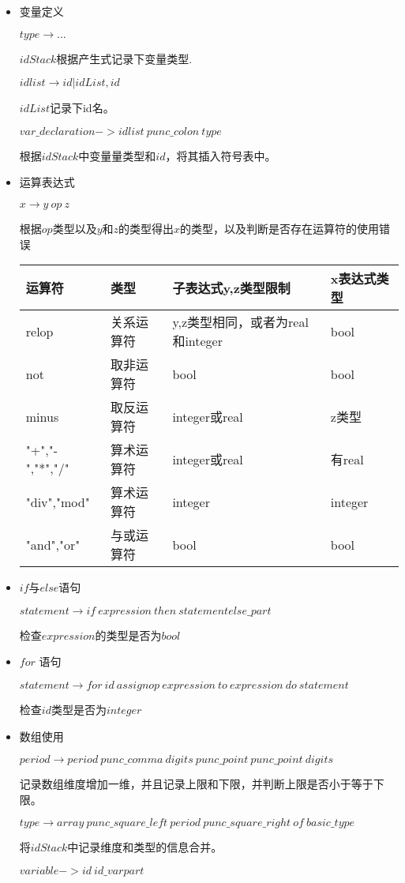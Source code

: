 \documentclass[]{ctexart}
\begin{document}
\begin{itemize}
\item
  变量定义

  \(type \to ...\)

  \(idStack\)根据产生式记录下变量类型.

  \(idlist \to id | idList,id\)

  \(idList\)记录下id名。

  \(var\_declaration->idlist\ punc\_colon\ type\)

  根据\(idStack\)中变量量类型和\(id\)，将其插入符号表中。
\item
  运算表达式

  \(x \to y\ op \ z\)

  根据\(op\)类型以及\(y\)和\(z\)的类型得出\(x\)的类型，以及判断是否存在运算符的使用错误

  \begin{longtable}[]{@{}llll@{}}
  运算符 & 类型 & 子表达式y,z类型限制 & x表达式类型\tabularnewline
  \midrule
  \endhead
  relop & 关系运算符 & y,z类型相同，或者为real和integer &
  bool\tabularnewline
  not & 取非运算符 & bool & bool\tabularnewline
  minus & 取反运算符 & integer或real & z类型\tabularnewline
  "+","-","*","/" & 算术运算符 & integer或real & 有real\tabularnewline
  "div","mod" & 算术运算符 & integer & integer\tabularnewline
  "and","or" & 与或运算符 & bool & bool\tabularnewline
  \bottomrule
  \end{longtable}
\item
  \(if\)与\(else\)语句

  \(statement\to if\ expression\ then\ statement else\_part\)

  检查\(expression\)的类型是否为\(bool\)
\item
  \(for\) 语句

  \(statement\to for\ id\ assignop\ expression\ to\ expression\ do\ statement\)

  检查\(id\)类型是否为\(integer\)
\item
  数组使用

  \(period\to period\ punc\_comma\ digits\ punc\_point\ punc\_point\ digits\)

  记录数组维度增加一维，并且记录上限和下限，并判断上限是否小于等于下限。

  \(type\to array\ punc\_square\_left\ period\ punc\_square\_right\ of\ basic\_type\)

  将\(idStack\)中记录维度和类型的信息合并。

  \(variable->id\ id\_varpart\)


\end{itemize}
\end{document}
